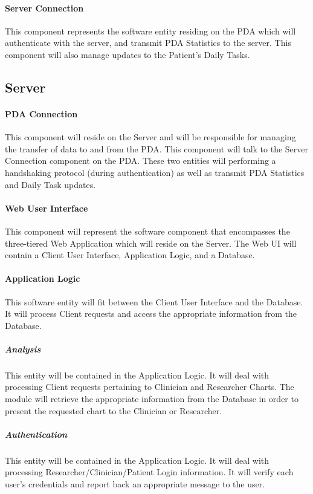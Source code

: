 \documentclass{article}
\begin{document}
\paragraph{Server Connection}
This component represents the software entity residing on the PDA which will authenticate with the server, and transmit PDA Statistics to the server. This component will also manage updates to the Patient's Daily Tasks.

\subsection{Server}

\paragraph{PDA Connection}
This component will reside on the Server and will be responsible for managing the transfer of data to and from the PDA. This component will talk to the Server Connection component on the PDA. These two entities will performing a handshaking protocol (during authentication) as well as transmit PDA Statistics and Daily Task updates.

\paragraph{Web User Interface}
This component will represent the software component that encompasses the three-tiered Web Application which will reside on the Server. The Web UI will contain a Client User Interface, Application Logic, and a Database.

\paragraph{Application Logic}
This software entity will fit between the Client User Interface and the Database. It will process Client requests and access the appropriate information from the Database. 

\subparagraph{Analysis}
This entity will be contained in the Application Logic. It will deal with processing Client requests pertaining to Clinician and Researcher Charts. The module will retrieve the appropriate information from the Database in order to present the requested chart to the Clinician or Researcher.

\subparagraph{Authentication}
This entity will be contained in the Application Logic. It will deal with processing Researcher/Clinician/Patient Login information. It will verify each user's credentials and report back an appropriate message to the user.
\end{document}
